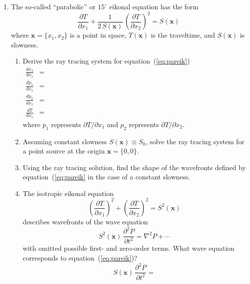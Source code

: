\begin{enumerate}
\item The so-called ``parabolic'' or $15^{\circ}$ eikonal
  equation \cite[]{tappert,iei,bamberger} has the form
  \begin{equation}
    {\frac{\partial T}{\partial x_1}} + 
    {\frac{1}{2\,S(\mathbf{x})}\,\left(\frac{\partial T}{\partial x_2}\right)^2} =
    {S(\mathbf{x})}
    \label{eq:pareik}
  \end{equation}
  where $\mathbf{x}=\{x_1,x_2\}$ is a point in space, $T(\mathbf{x})$
  is the traveltime, and $S(\mathbf{x})$ is slowness. 
  \begin{enumerate}
  \item Derive the ray tracing system for equation~(\ref{eq:pareik})
    \begin{eqnarray}
      \label{eq:xt}
      \frac{d x_2}{d x_1} & = & \hspace{5in} \\
      \label{eq:pxt}
      \frac{d p_1}{d x_1} & = & \\
      \label{eq:pzt}
      \frac{d p_2}{d x_1} & = & \\
      \label{eq:tt}
      \frac{d T}{d x_1} & = &
    \end{eqnarray}
    where $p_1$ represents $\partial T/\partial x_1$ and 
    $p_2$ represents $\partial T/\partial x_2$.
  \item Assuming constant slowness $S(\mathbf{x}) \equiv S_0$, solve
    the ray tracing system for a point source at the origin
    $\mathbf{x} = \{0,0\}$.
  \item Using the ray tracing solution, find the shape of the
    wavefronts defined by equation~(\ref{eq:pareik} in the case of a
    constant slowness.
  \item The isotropic eikonal equation
    \begin{equation}
      \label{eq:iso}
      \left(\frac{\partial T}{\partial x_1}\right)^2 +
      \left(\frac{\partial T}{\partial x_2}\right)^2 = S^2(\mathbf{x})
    \end{equation}
    describes wavefronts of the wave equation
    \begin{equation}
      \label{eq:isowave}
      S^2(\mathbf{x})\,\frac{\partial^2 P}{\partial t^2} =
      \nabla^2 P + \cdots
    \end{equation}
    with omitted possible first- and zero-order terms. 
    What wave equation corresponds to equation~(\ref{eq:pareik})?
    \begin{equation}
      S(\mathbf{x})\,{\frac{\partial^2 P}{\partial t^2}} =
      \label{eq:parwave}
    \end{equation}
  \end{enumerate}
\end{enumerate}

